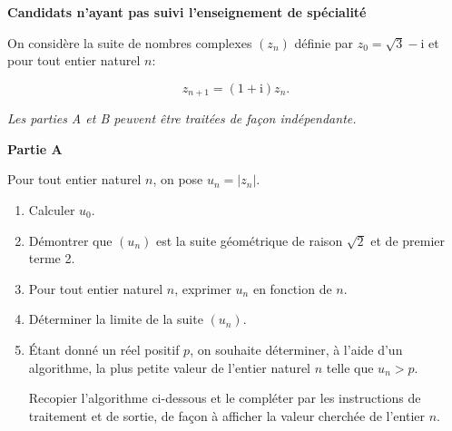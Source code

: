 \documentclass[10pt]{article}
\begin{document}
\medskip

\textbf{Candidats n'ayant pas suivi l'enseignement de spécialité}

\medskip

On considère la suite de nombres complexes $\left(z_n\right)$ définie par $z_0=\sqrt{3}-\mathrm{i}$ et pour tout entier naturel $n$:

\[z_{n+1} = (1 + \mathrm{i})z_n.\]

\emph{Les parties A et B peuvent être traitées de façon indépendante.}

\medskip

\textbf{Partie A}

\medskip

Pour tout entier naturel $n$, on pose $u_n = \left|z_{n}\right|$.

\medskip


\begin{enumerate}
\item Calculer $u_0$.
\item Démontrer que $\left(u_n\right)$ est la suite géométrique de raison $\sqrt{2}$ et de premier terme 2.
\item Pour tout entier naturel $n$, exprimer $u_n$ en fonction de $n$.
\item Déterminer la limite de la suite $\left(u_n\right)$.
\item Étant donné un réel positif $p$, on souhaite déterminer, à l'aide d'un algorithme, la plus petite valeur de l'entier naturel $n$ telle que $u_n > p$.

Recopier l'algorithme ci-dessous et le compléter par les instructions de traitement et de sortie, de façon à afficher la valeur cherchée de l'entier $n$.
\begin{center}
\end{center}
\end{enumerate}
\end{document}
